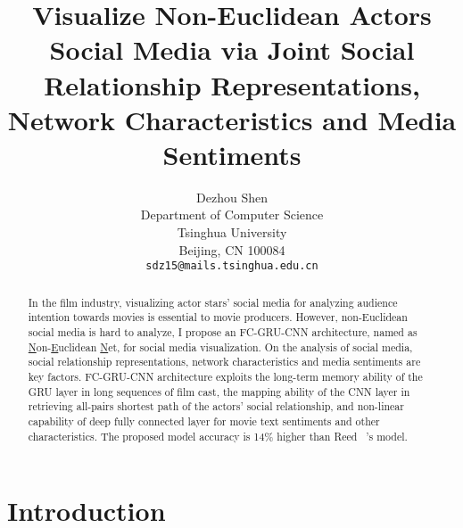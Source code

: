 \documentclass[review]{cvpr}
\begin{document}
\title{Visualize Non-Euclidean Actors Social Media via Joint Social Relationship Representations, Network Characteristics and Media Sentiments}

\author{Dezhou Shen\\
Department of Computer Science\\
Tsinghua University\\
Beijing, CN 100084\\
{\tt\small sdz15@mails.tsinghua.edu.cn}
}

\maketitle


\begin{abstract}

  In the film industry, visualizing actor stars' social media for analyzing audience intention towards movies is essential to movie producers.
  However, non-Euclidean social media is hard to analyze, I propose an FC-GRU-CNN architecture, named as \underline{N}on-\underline{E}uclidean \underline{N}et, for social media visualization.
  On the analysis of social media, social relationship representations, network characteristics and media sentiments are key factors.
  FC-GRU-CNN architecture exploits the long-term memory ability of the GRU layer in long sequences of film cast,
  the mapping ability of the CNN layer in retrieving all-pairs shortest path of the actors' social relationship,
  and non-linear capability of deep fully connected layer for movie text sentiments and other characteristics.
  The proposed model accuracy is 14\% higher than Reed \etal~\cite{reed2016learning}'s model.

\end{abstract}

\section{Introduction}
\end{document}
